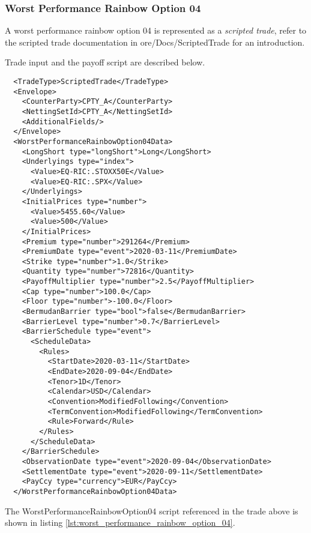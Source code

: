 \subsubsection*{Worst Performance Rainbow Option 04}

A worst performance rainbow option 04 is represented as a {\em scripted trade},
refer to the scripted trade documentation in ore/Docs/ScriptedTrade
for an introduction.

Trade input and the payoff script are described below.

\begin{verbatim}
  <TradeType>ScriptedTrade</TradeType>
  <Envelope>
    <CounterParty>CPTY_A</CounterParty>
    <NettingSetId>CPTY_A</NettingSetId>
    <AdditionalFields/>
  </Envelope>
  <WorstPerformanceRainbowOption04Data>
    <LongShort type="longShort">Long</LongShort>
    <Underlyings type="index">
      <Value>EQ-RIC:.STOXX50E</Value>
      <Value>EQ-RIC:.SPX</Value>
    </Underlyings>
    <InitialPrices type="number">
      <Value>5455.60</Value>
      <Value>500</Value>
    </InitialPrices>
    <Premium type="number">291264</Premium>
    <PremiumDate type="event">2020-03-11</PremiumDate>
    <Strike type="number">1.0</Strike>
    <Quantity type="number">72816</Quantity>
    <PayoffMultiplier type="number">2.5</PayoffMultiplier>
    <Cap type="number">100.0</Cap>
    <Floor type="number">-100.0</Floor>
    <BermudanBarrier type="bool">false</BermudanBarrier>
    <BarrierLevel type="number">0.7</BarrierLevel>
    <BarrierSchedule type="event">
      <ScheduleData>
        <Rules>
          <StartDate>2020-03-11</StartDate>
          <EndDate>2020-09-04</EndDate>
          <Tenor>1D</Tenor>
          <Calendar>USD</Calendar>
          <Convention>ModifiedFollowing</Convention>
          <TermConvention>ModifiedFollowing</TermConvention>
          <Rule>Forward</Rule>
        </Rules>
      </ScheduleData>
    </BarrierSchedule>
    <ObservationDate type="event">2020-09-04</ObservationDate>
    <SettlementDate type="event">2020-09-11</SettlementDate>
    <PayCcy type="currency">EUR</PayCcy>
  </WorstPerformanceRainbowOption04Data>
\end{verbatim}

The WorstPerformanceRainbowOption04 script referenced in the trade above is shown in listing
\ref{lst:worst_performance_rainbow_option_04}.

